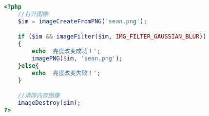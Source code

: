 \begin{lstlisting}[language=PHP]
<?php
	//打开图像
	$im = imageCreateFromPNG('sean.png');

	if ($im && imageFilter($im, IMG_FILTER_GAUSSIAN_BLUR)) 
	{
	    echo '亮度改变成功！';
	    imagePNG($im, 'sean.png');
	}else{
	    echo '亮度改变失败！';
	}

	//消除内存图像
	imageDestroy($im);
?>
\end{lstlisting}





\begin{lstlisting}[language=PHP]

\end{lstlisting}





\begin{lstlisting}[language=PHP]

\end{lstlisting}




\begin{lstlisting}[language=PHP]

\end{lstlisting}




\begin{lstlisting}[language=PHP]

\end{lstlisting}




\begin{lstlisting}[language=PHP]

\end{lstlisting}




\begin{lstlisting}[language=PHP]

\end{lstlisting}



\begin{lstlisting}[language=PHP]

\end{lstlisting}



\begin{lstlisting}[language=PHP]

\end{lstlisting}





